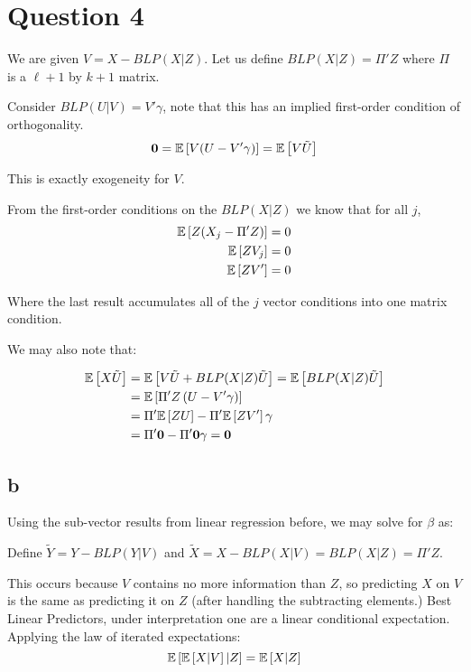 \documentclass[12pt]{paper}
\begin{document}
\section*{Question 4}

We are given $V = X - BLP(X \vert Z)$. Let us define
$BLP(X \vert Z) = \Pi' Z$ where $\Pi$ is a $\ell+1$ by $k +1$ matrix.

Consider $BLP( U \vert V) = V' \gamma$, note that this has an implied
first-order condition of orthogonality.
\begin{equation*}
  \bm{ 0 } = \mathbb{E} \left [  V ( U - V' \gamma) \right ] = \mathbb{E} \left [  V \tilde{U} \right ]
\end{equation*}

This is exactly exogeneity for $V$.

From the first-order conditions on the $BLP( X \vert Z)$ we know that for
all $j$,
\begin{align*}
  \mathbb{E} \left [  Z ( X_j - \Pi' Z) \right ] &= 0\\
  \mathbb{E} \left [  Z V_j  \right ] &= 0\\
  \mathbb{E} \left [  Z V' \right ] &= 0
\end{align*}

Where the last result accumulates all of the $j$ vector conditions
into one matrix condition.

We may also note that:

\begin{align*}
  \mathbb{E} \left [  X \tilde{U} \right ] &= \mathbb{E} \left [  V \tilde{U} + BLP( X \vert Z) \tilde{U} \right ] =
                       \mathbb{E} \left [  BLP( X \vert Z) \tilde{U} \right ]\\
  &=\mathbb{E} \left [   \Pi' Z \left( U - V'\gamma \right) \right ]\\
  &= \Pi' \mathbb{E} \left [  Z U \right ] - \Pi' \mathbb{E} \left [ Z V' \right ]\gamma\\
  &= \Pi ' \bm{ 0 } - \Pi' \bm{ 0 } \gamma = \bm{ 0 }\\
\end{align*}

\subsection*{b}

Using the sub-vector results from linear regression before, we may
solve for $\beta$ as:

Define $\tilde{Y} = Y - BLP( Y \vert V)$ and $\tilde{X} = X - BLP( X \vert V)
= BLP( X \vert Z) = \Pi'Z$.


This occurs because $V$ contains no more information than $Z$, so
predicting $X$ on $V$ is the same as predicting it on $Z$ (after
handling the subtracting elements.) Best Linear Predictors, under
interpretation one are a linear conditional expectation. Applying the
law of iterated expectations:
\begin{equation*}
  \mathbb{E} \left [  \mathbb{E} \left [  X \vert V \right ] \vert Z \right ] = \mathbb{E} \left [  X \vert Z \right ]
\end{equation*}
\end{document}
